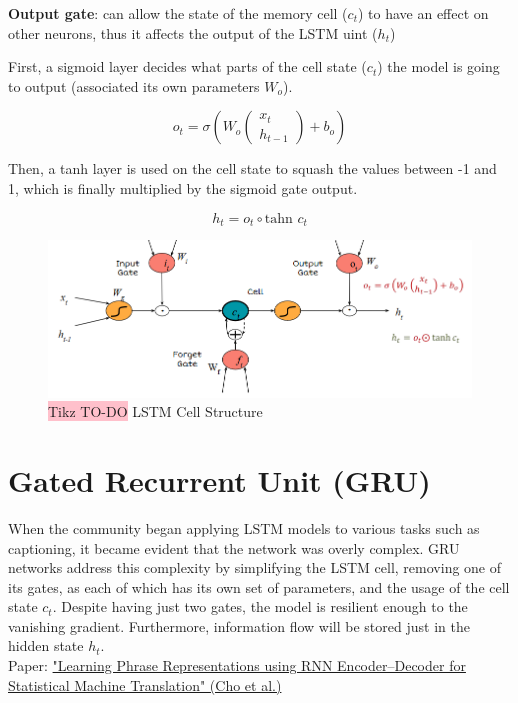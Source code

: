     
\textbf{Output gate}: can allow the state of the memory cell ($c_t$) to have an effect on other neurons, thus it affects the output of the LSTM uint ($h_t$)
    
First, a sigmoid layer decides what parts of the cell state ($c_t$) the model is going to output (associated its own parameters $W_o$).

$$ o_t = \sigma(W_o
\begin{pmatrix}
x_t \\
h_{t-1}
\end{pmatrix} + b_o)
$$

Then, a tanh layer is used on the cell state to squash the values between -1 and 1, which is finally multiplied by the sigmoid gate output.

$$h_t = o_t \circ \text{tahn } c_{t} $$


\begin{figure}[!htbp]
    \centering
    \includegraphics[width=\linewidth]{tikz/chapter6 - LSTM.png}
    \caption{{\color{red}\colorbox{pink}{Tikz TO-DO}} LSTM Cell Structure}
\end{figure}


\section{Gated Recurrent Unit (GRU)}

When the community began applying LSTM models to various tasks such as captioning, it became evident that the network was overly complex. GRU networks address this complexity by simplifying the LSTM cell, removing one of its gates, as each of which has its own set of parameters, and the usage of the cell state $c_t$. Despite having just two gates, the model is resilient enough to the vanishing gradient. Furthermore, information flow will be stored just in the hidden state $h_t$.\\
Paper: \href{https://arxiv.org/pdf/1406.1078}{"Learning Phrase Representations using RNN Encoder–Decoder
for Statistical Machine Translation" (Cho et al.)}


